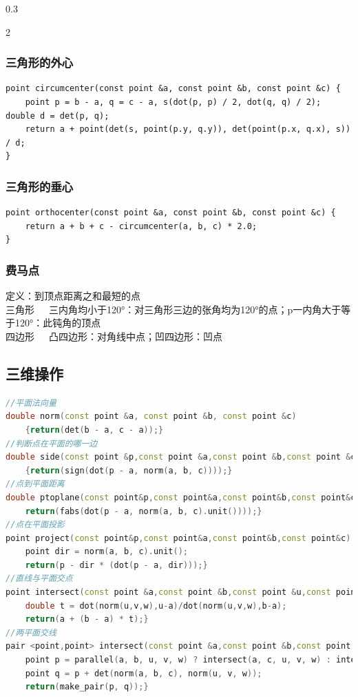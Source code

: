 \documentclass[landscape,a4paper]{article}
\begin{document}
\begin{spacing}{0.3}
\begin{multicols}{2}
\subsubsection{三角形的外心}
\begin{lstlisting}
point circumcenter(const point &a, const point &b, const point &c) {
	point p = b - a, q = c - a, s(dot(p, p) / 2, dot(q, q) / 2); double d = det(p, q);
	return a + point(det(s, point(p.y, q.y)), det(point(p.x, q.x), s)) / d;
}
\end{lstlisting}

\subsubsection{三角形的垂心}
\begin{lstlisting}
point orthocenter(const point &a, const point &b, const point &c) {
	return a + b + c - circumcenter(a, b, c) * 2.0;
}
\end{lstlisting}
\subsubsection{费马点}
    定义：到顶点距离之和最短的点\\
    三角形~~~三内角均小于120°：对三角形三边的张角均为120°的点；p一内角大于等于120°：此钝角的顶点\\
    四边形~~~凸四边形：对角线中点；凹四边形：凹点\\

\subsection{三维操作}
\begin{lstlisting}[language=C++]
//平面法向量
double norm(const point &a, const point &b, const point &c)
    {return(det(b - a, c - a));}
//判断点在平面的哪一边
double side(const point &p,const point &a,const point &b,const point &c)
    {return(sign(dot(p - a, norm(a, b, c))));}
//点到平面距离
double ptoplane(const point&p,const point&a,const point&b,const point&c) {
    return(fabs(dot(p - a, norm(a, b, c).unit())));}
//点在平面投影
point project(const point&p,const point&a,const point&b,const point&c) {
    point dir = norm(a, b, c).unit();
    return(p - dir * (dot(p - a, dir)));}
//直线与平面交点
point intersect(const point &a,const point &b,const point &u,const point &v,const point &w) {
    double t = dot(norm(u,v,w),u-a)/dot(norm(u,v,w),b-a);
    return(a + (b - a) * t);}
//两平面交线
pair <point,point> intersect(const point &a,const point &b,const point &c,const point &u, const point &v, const point &w) {
    point p = parallel(a, b, u, v, w) ? intersect(a, c, u, v, w) : intersect(a, b, u, v, w);
    point q = p + det(norm(a, b, c), norm(u, v, w));
    return(make_pair(p, q));}
\end{lstlisting}


\end{multicols}
\end{spacing}
\end{document}

